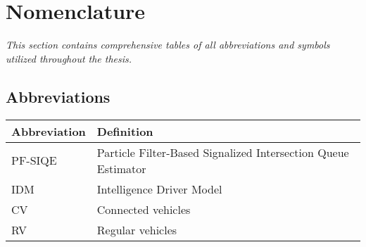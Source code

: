 \chapter*{Nomenclature}

\emph{This section contains comprehensive tables of all abbreviations and symbols utilized throughout the thesis.}

\section*{Abbreviations}

\begin{longtable}{p{2.5cm}p{8cm}}
    \toprule
    Abbreviation & Definition \\
    \midrule\endhead %
    PF-SIQE & Particle Filter-Based Signalized Intersection Queue Estimator \\
    IDM & Intelligence Driver Model\\
    CV & Connected vehicles\\
    RV& Regular vehicles\\
    \bottomrule
\end{longtable}

